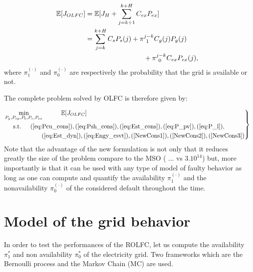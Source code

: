 \documentclass[conference]{IEEEtran}
\begin{document}
\begin{equation}
    \begin{split}
        \mathbb{E}[J_{OLFC}] &=\mathbb{E}[J_H + \sum_{j=k+1}^{k+H}C_{ex}P_{ex}] \\
                             &=\sum_{j=k}^{k+H}  C_sP_s(j) + \pi_{\;\,1}^{j-k}C_g(j)P_g(j)\\
                             &\hspace{85px} + \pi_{\;\,0}^{j-k}C_{ex}P_{ex}(j), 
    \end{split}
\end{equation}where $\pi_1^{(\cdot)}$ and  $\pi_0^{(\cdot)}$ are respectively the probability that the grid is available or not. 

The complete problem solved by OLFC is therefore given by: 

\begin{equation}\label{eq:OLFCsys}
\left. 
\begin{aligned}
&\underset{P_g,P_{sp},P_b,P_s,P_{ex}}{\text{min}} \hspace{30px}\mathbb{E}[J_{OLFC}]\\
& \text{\hspace{10px} s.t.\hspace{15px}}(\ref{eq:Pcu_cons}),(\ref{eq:Psh_cons}),(\ref{eq:Est_cons}),(\ref{eq:P_pv}),(\ref{eq:P_l}),\\
& \hspace{60px}(\ref{eq:Est_dyn}),(\ref{eq:Engy_csvt}),(\ref{NewCons1}),(\ref{NewCons2}),(\ref{NewCons3})
\end{aligned}\right \}
\end{equation}
Note that the advantage of the new formulation is not only that it reduces greatly the size of the problem compare to the MSO ( ... vs $3.10^{14}$) but, more importantly is that it can be used with any type of model of faulty behavior as long as one can compute and quantify the availability $\pi_1^{(\cdot)}$ and the nonavailability $\pi_0^{(\cdot)}$ of the considered default throughout the time. 


\section {Model of the grid behavior}\label{ModelGriBeh}
In order to test the performances of the ROLFC, let us compute the availability $\pi_1^*$ and non availability $\pi_0^*$ of the electricity grid. Two frameworks which are the Bernoulli process  and the Markov Chain (MC)\cite{RBiRna1992} are used. 
\end{document}
